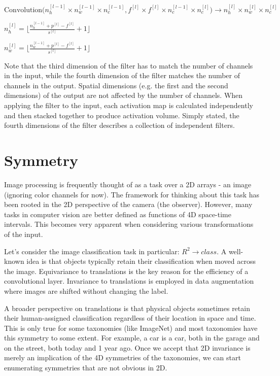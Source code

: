 \documentclass[11pt]{article}
\begin{document}
$
\text{Convolution} \big(
    n^{[l-1]}_h \times n^{[l-1]}_w \times n^{[l-1]}_c,
    f^{[l]} \times f^{[l]} \times n^{[l-1]}_c \times n^{[l]}_c
\big)
\rightarrow n^{[l]}_h \times n^{[l]}_w \times n^{[l]}_c
$

$ n^{[l]}_h = \big\lfloor \frac{n^{[l-1]}_h + p^{[l]} - f^{[l]}}{s^{[l]}} + 1 \big\rfloor $

$ n^{[l]}_w = \big\lfloor \frac{n^{[l-1]}_w + p^{[l]} - f^{[l]}}{s^{[l]}} + 1 \big\rfloor $

Note that the third dimension of the filter has to match the number of channels in the input,
while the fourth dimension of the filter matches the number of channels in the output.
Spatial dimensions (e.g. the first and the second dimensions) of the output are not affected by the number of channels.
When applying the filter to the input, each activation map is calculated independently and then stacked together to produce activation volume. Simply stated, the fourth dimensions of the filter describes a collection of independent filters.

\section{Symmetry}

Image processing is frequently thought of as a task over a 2D arrays - an image (ignoring color channels for now).
The framework for thinking about this task has been rooted in the 2D perspective of the camera (the observer).
However, many tasks in computer vision are better defined as functions of 4D space-time intervals.
This becomes very apparent when considering various transformations of the input.

Let's consider the image classification task in particular: $R^2 \rightarrow class$.
A well-known idea is that objects typically retain their classification when moved across the image.
Equivariance to translations is the key reason for the efficiency of a convolutional layer.
Invariance to translations is employed in data augmentation where images are shifted without changing the label.

A broader perspective on translations is that physical objects sometimes retain
their human-assigned classification regardless of their location in space and time.
This is only true for some taxonomies (like ImageNet) and most taxonomies have this symmetry to some extent.
For example, a car is a car, both in the garage and on the street, both today and 1 year ago.
Once we accept that 2D invariance is merely an implication of the 4D symmetries of the taxonomies,
we can start enumerating symmetries that are not obvious in 2D\@.
\end{document}
